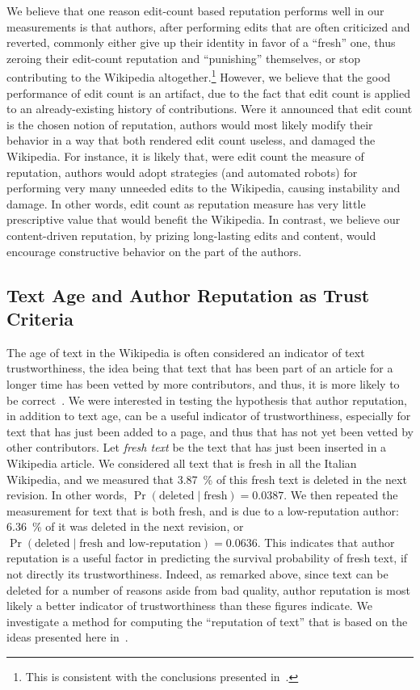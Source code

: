 We believe that one reason edit-count based reputation performs well
in our measurements is that authors, after performing edits that are
often criticized and reverted, commonly either give up their identity
in favor of a ``fresh'' one, thus zeroing their edit-count reputation
and ``punishing'' themselves, or stop contributing to the Wikipedia
altogether.\footnote{This is consistent with the conclusions presented
in~\cite{Halfaker2011}.}
However, we believe that the good performance of edit count is an
artifact, due to the fact that edit count is applied to an
already-existing history of contributions.
Were it announced that edit count is the chosen notion of reputation,
authors would most likely modify their behavior in a way that both
rendered edit count useless, and damaged the Wikipedia.
For instance, it is likely that, were edit count the measure of
reputation, authors would adopt strategies (and automated robots) for
performing very many unneeded edits to the Wikipedia, causing
instability and damage.
In other words, edit count as reputation measure has very little
prescriptive value that would benefit the Wikipedia.
In contrast, we believe our content-driven reputation, by prizing
long-lasting edits and content, would encourage constructive behavior
on the part of the authors.

\subsection{Text Age and Author Reputation as Trust Criteria}

The age of text in the Wikipedia is often considered an
indicator of text trustworthiness, the idea being that text that has
been part of an article for a longer time has been vetted by more
contributors, and thus, it is more likely to be correct~\cite{Cross2006}.
We were interested in testing the hypothesis that author reputation,
in addition to text age, can be a useful indicator of
trustworthiness, especially for text that has just been added to a
page, and thus that has not yet been vetted by other contributors.
Let {\em fresh text\/} be the text that has just been inserted in a
Wikipedia article.
We considered all text that is fresh in all the Italian
Wikipedia, and we measured that 3.87~\% of this fresh text is deleted
in the next revision.  In other words,
$\Pr(\mbox{deleted}\mid\mbox{fresh}) = 0.0387$.
We then repeated the measurement for text that is both fresh, and is
due to a low-reputation author: 6.36~\% of it was deleted in the next
revision, or
$\Pr(\mbox{deleted}\mid\mbox{fresh and low-reputation}) = 0.0636$.
This indicates that author reputation is a useful factor in predicting
the survival probability of fresh text, if not directly its
trustworthiness.
Indeed, as remarked above, since text can be deleted for a number of
reasons aside from bad quality, author reputation is most likely a
better indicator of trustworthiness than these figures indicate.
We investigate a method for computing the ``reputation of text'' that
is based on the ideas presented here in~\cite{Adler2008b}.


